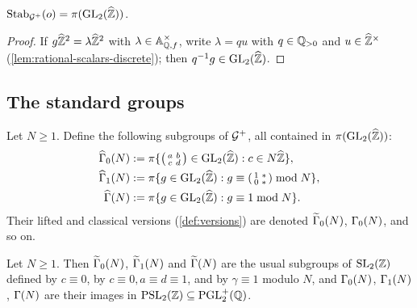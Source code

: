 \begin{lemma}\label{lem:stab-base-vertex}
$\Stab_{\AdelicGroup}(\BaseVertex) = \AdelicProjection(\GL{2}{\ProfiniteIntegers})$.
\end{lemma}

\begin{proof}
If $g\widehat{\mathbb{Z}}^{2} = \lambda\widehat{\mathbb{Z}}^{2}$
with $\lambda \in \mathbb{A}_{\mathbb{Q},f}^{\times}$, write $\lambda = qu$ with
$q \in \mathbb{Q}_{>0}$ and $u \in \widehat{\mathbb{Z}}^{\times}$
(\cref{lem:rational-scalars-discrete}); then $q^{-1}g \in \GL{2}{\ProfiniteIntegers}$.
\end{proof}

\subsection{The standard groups}

\begin{definition}\label{def:adelic-standard-groups}
Let $N \geq 1$. Define the following subgroups of $\mathcal{G}^{+}$, all
contained in $\AdelicProjection(\GL{2}{\ProfiniteIntegers})$:
\begin{align*}
  \GammaZero[ad]{N} &:= \AdelicProjection\{\smallMat{a}{b}{c}{d} \in \GL{2}{\ProfiniteIntegers} : c \in N\ProfiniteIntegers\},\\
  \GammaOne[ad]{N} &:= \AdelicProjection\{g \in \GL{2}{\ProfiniteIntegers} : g \equiv \smallMat{1}{*}{0}{*} \bmod N\},\\
  \GammaFull[ad]{N} &:= \AdelicProjection\{g \in \GL{2}{\ProfiniteIntegers} : g \equiv 1 \bmod N\}.
\end{align*}
Their lifted and classical versions (\cref{def:versions}) are denoted
$\GammaZero[lift]{N}$, $\GammaZero{N}$, and so on.
\end{definition}

\begin{lemma}
\label{lem:classical-standard-groups}
Let $N \geq 1$. Then $\GammaZero[lift]{N}$, $\GammaOne[lift]{N}$ and
$\GammaFull[lift]{N}$ are the usual subgroups of $\SL{2}{\ZZ}$ defined by
$c \equiv 0$, by $c \equiv 0, a \equiv d \equiv 1$, and by
$\gamma \equiv 1$ modulo $N$, and $\GammaZero{N}$, $\GammaOne{N}$,
$\GammaFull{N}$ are their images in $\PSL{2}{\ZZ} \subseteq \RationalProjGroup$.
\end{lemma}


